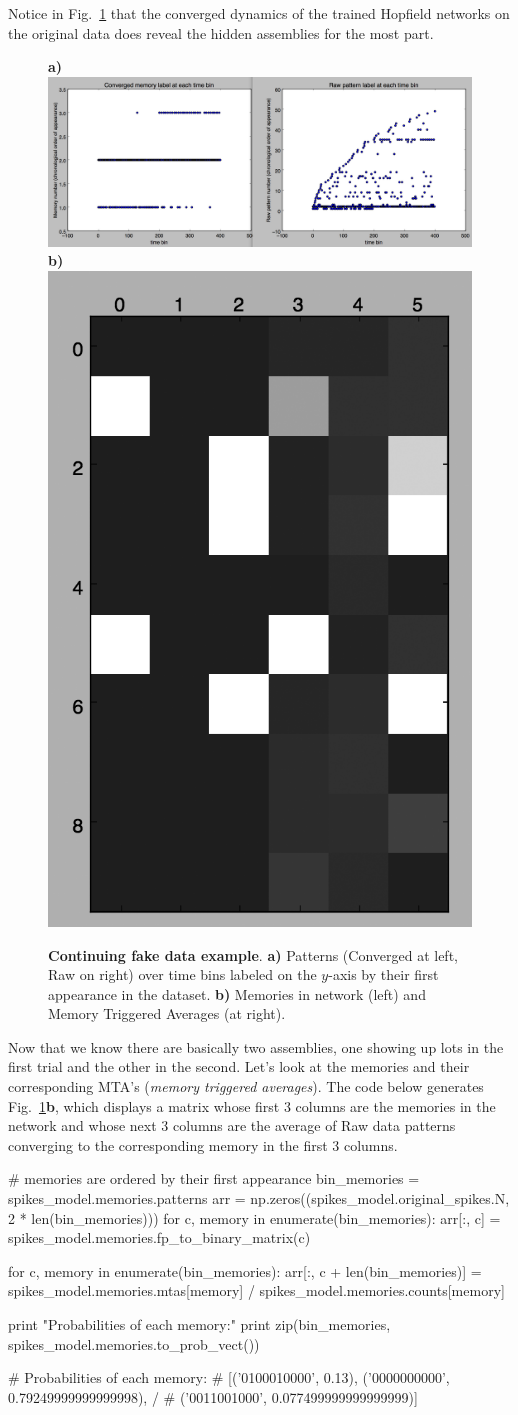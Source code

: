 \documentclass[letter, 12pt]{article}
\theoremstyle{definition}
\theoremstyle{remark}
\begin{document}
Notice in Fig.~\ref{fake_ex_fig2} that the converged dynamics of the trained Hopfield networks on the original data does reveal the 
hidden assemblies for the most part.

\begin{figure}[t!]
\begin{center}
\textbf{a)}\includegraphics[width=.75\linewidth]{chron_order_patterns.png} 
\textbf{b)}\includegraphics[width=.19\linewidth]{memories_stas.png} 
\caption{\textbf{Continuing fake data example}. \textbf{a)} Patterns (Converged at left, Raw on right) over time bins labeled on the $y$-axis by their first appearance in the dataset.  \textbf{b)}  Memories in network (left) and Memory Triggered Averages (at right).}
\label{fake_ex_fig2}
\vspace{-.8cm}
\end{center}
\end{figure}

Now that we know there are basically two assemblies, one showing up lots in the first trial and the other in the second.  Let's look at the
memories and their corresponding MTA's (\textit{memory triggered averages}).  The code below generates Fig.~\ref{fake_ex_fig2}\textbf{b}, which displays
a matrix whose first 3 columns are the memories in the network and whose next 3 columns are the average of Raw data patterns converging to the corresponding memory in the first 3 columns.

\begin{python}
# memories are ordered by their first appearance
bin_memories = spikes_model.memories.patterns
arr = np.zeros((spikes_model.original_spikes.N, 2 * len(bin_memories)))
for c, memory in enumerate(bin_memories):
	arr[:, c] = spikes_model.memories.fp_to_binary_matrix(c)

for c, memory in enumerate(bin_memories):
	arr[:, c + len(bin_memories)] = spikes_model.memories.mtas[memory] /
			spikes_model.memories.counts[memory]

print "Probabilities of each memory:"
print zip(bin_memories, spikes_model.memories.to_prob_vect())

# Probabilities of each memory:
# [('0100010000', 0.13), ('0000000000', 0.79249999999999998), /
# ('0011001000', 0.077499999999999999)]
\end{python}
\end{document}
